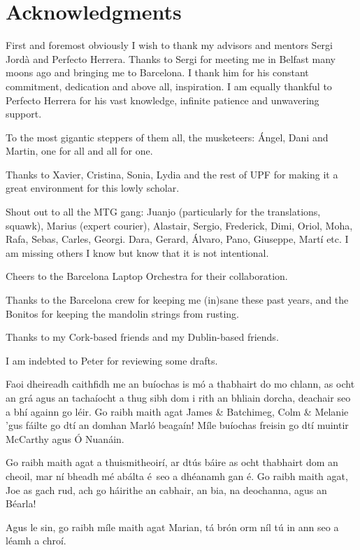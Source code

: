 \chapter*{Acknowledgments}

First and foremost obviously I wish to thank my advisors and mentors Sergi Jordà and Perfecto Herrera. Thanks to Sergi for meeting me in Belfast many moons ago and bringing me to Barcelona. I thank him for his constant commitment, dedication and above all, inspiration. I am equally thankful to Perfecto Herrera for his vast knowledge, infinite patience and unwavering support. 

To the most gigantic steppers of them all, the musketeers: Ángel, Dani and Martin, one for all and all for one.

Thanks to Xavier, Cristina, Sonia, Lydia and the rest of UPF for making it a great environment for this lowly scholar.

Shout out to all the MTG gang: Juanjo (particularly for the translations, squawk), Marius (expert courier), Alastair, Sergio, Frederick, Dimi, Oriol, Moha, Rafa, Sebas, Carles, Georgi. Dara, Gerard, Álvaro, Pano, Giuseppe, Martí etc. I am missing others I know but know that it is not intentional. 

Cheers to the Barcelona Laptop Orchestra for their collaboration.

Thanks to the Barcelona crew for keeping me (in)sane these past years, and the Bonitos for keeping the mandolin strings from rusting.

Thanks to my Cork-based friends and my Dublin-based friends.

I am indebted to Peter for reviewing some drafts.

Faoi dheireadh caithfidh me an buíochas is mó a thabhairt do mo chlann, as ocht an grá agus an  tachaíocht a thug sibh dom i rith an bhliain dorcha, deachair seo a bhí againn go léir. Go raibh maith agat James \& Batchimeg, Colm \& Melanie 'gus fáilte go dtí an domhan Marló beagaín! Míle buíochas freisin go dtí muintir McCarthy agus Ó Nuanáin.

Go raibh maith agat a thuismitheoirí, ar dtús báire as ocht thabhairt dom an cheoil, mar ní bheadh mé abálta é seo a dhéanamh gan é. Go raibh maith agat, Joe as gach rud, ach go háirithe an cabhair, an bia, na deochanna, agus an Béarla!

Agus le sin, go raibh míle maith agat Marian, tá brón orm níl tú in ann seo a léamh a chroí.
%
%
\normalsize